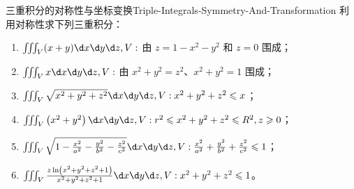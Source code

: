 \begin{problem}{三重积分的对称性与坐标变换}{Triple-Integrals-Symmetry-And-Transformation}
    利用对称性求下列三重积分：
    \begin{enumerate}
        \item $\iiint_{V} (x+y) \d x \d y \d z, V:$ 由 $z=1-x^{2}-y^{2}$ 和 $z=0$ 围成；
        \item $\iiint_{V} x \d x \d y \d z, V:$ 由 $x^{2}+y^{2}=z^{2}、x^{2}+y^{2}=1$ 围成；
        \item $\iiint_{V} \sqrt{x^{2}+y^{2}+z^{2}} \d x \d y \d z, V: x^{2}+y^{2}+z^{2} \leqslant x$；
        \item $\iiint_{V}\left(x^{2}+y^{2}\right) \d x \d y \d z, V: r^{2} \leqslant x^{2}+y^{2}+z^{2} \leqslant R^{2}, z \geqslant 0$；
        \item $\iiint_{V} \sqrt{1-\frac{x^{2}}{a^{2}}-\frac{y^{2}}{b^{2}}-\frac{z^{2}}{c^{2}}} \d x \d y \d z, V: \frac{x^{2}}{a^{2}}+\frac{y^{2}}{b^{2}}+\frac{z^{2}}{c^{2}} \leqslant 1$；
        \item $\iiint_{V} \frac{z \ln \left(x^{2}+y^{2}+z^{2}+1\right)}{x^{2}+y^{2}+z^{2}+1} \d x \d y \d z, V: x^{2}+y^{2}+z^{2} \leqslant 1$。
    \end{enumerate}
\end{problem}

